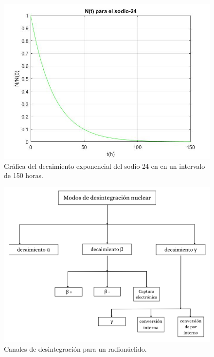 \begin{figure}[H]
	\begin{center}
		\includegraphics[scale=0.47]{imagenes/decaimiento_sodio_24.jpg}
		\caption{Gráfica del decaimiento exponencial del sodio-24 en en un intervalo de 150 horas.}
		\label{decaimientodelsodio24}
	\end{center}
\end{figure}

\begin{figure}[H]
	\begin{center}
		\includegraphics[scale=0.47]{imagenes/decay.png}
		\caption{Canales de desintegración para un radionúclido.}\label{channels}
	\end{center}
\end{figure}

